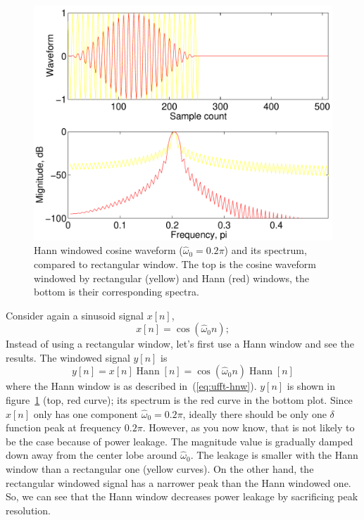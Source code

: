 \begin{figure}
\centerline{\includegraphics[height=0.35\textheight]{ch-fft/ufft_hannrect_cosx512_256}}
\caption[Hann windowed cosine waveform and its spectrum]{Hann windowed
cosine waveform ($\hat{\omega}_0=0.2\pi$) and its spectrum, compared to
rectangular window. The top is the cosine waveform windowed by
rectangular (yellow) and Hann (red) windows, the bottom is their
corresponding spectra.\label{fig:ufft-hnrt-cosx}}
\end{figure}

Consider again a sinusoid signal $x[n]$, 
\begin{equation}
x[n] = \cos(\hat{\omega}_0 n);
\end{equation}
Instead of using a rectangular window, let's first use a Hann window
and see the results. The windowed signal $y[n]$ is
\begin{equation}
y[n] = x[n] \operatorname{Hann}[n]
     = \cos(\hat{\omega}_0 n)\operatorname{Hann}[n]
\end{equation}
where the Hann window is as described in~(\ref{eq:ufft-hnw}). $y[n]$
is shown in figure~\ref{fig:ufft-hnrt-cosx} (top, red curve); its
spectrum is the red curve in the bottom plot. Since $x[n]$ only has
one component $\hat{\omega}_0=0.2\pi$, ideally there should be only
one $\delta$ function peak at frequency $0.2\pi$. However, as you now
know, that is not likely to be the case because of power leakage. The
magnitude value is gradually damped down away from the center lobe
around $\hat{\omega}_0$. The leakage is smaller with the Hann window
than a rectangular one (yellow curves). On the other hand, the
rectangular windowed signal has a narrower peak than the Hann windowed
one. So, we can see that the Hann window decreases power leakage by
sacrificing peak resolution.

